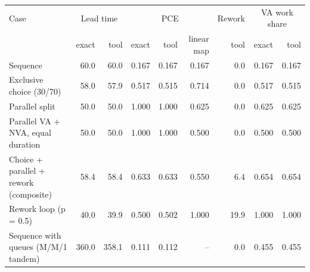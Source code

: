 \begin{tabular}{lrrrrrrrr}
\toprule
Case & \multicolumn{2}{c}{Lead time} & \multicolumn{3}{c}{PCE} & Rework & \multicolumn{2}{c}{VA work share} \\
 & exact & tool & exact & tool & linear map & tool & exact & tool \\
\midrule
Sequence & 60.0 & 60.0 & 0.167 & 0.167 & 0.167 & 0.0 & 0.167 & 0.167 \\
Exclusive choice (30/70) & 58.0 & 57.9 & 0.517 & 0.515 & 0.714 & 0.0 & 0.517 & 0.515 \\
Parallel split & 50.0 & 50.0 & 1.000 & 1.000 & 0.625 & 0.0 & 0.625 & 0.625 \\
Parallel VA + NVA, equal duration & 50.0 & 50.0 & 1.000 & 1.000 & 0.500 & 0.0 & 0.500 & 0.500 \\
Choice + parallel + rework (composite) & 58.4 & 58.4 & 0.633 & 0.633 & 0.550 & 6.4 & 0.654 & 0.654 \\
Rework loop (p = 0.5) & 40.0 & 39.9 & 0.500 & 0.502 & 1.000 & 19.9 & 1.000 & 1.000 \\
Sequence with queues (M/M/1 tandem) & 360.0 & 358.1 & 0.111 & 0.112 & -- & 0.0 & 0.455 & 0.455 \\
\bottomrule
\end{tabular}
